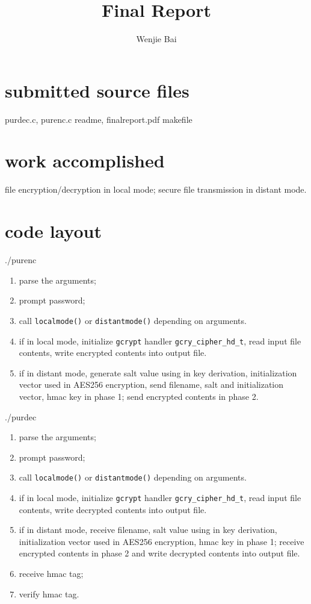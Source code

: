 \documentclass[11pt, oneside]{article}   	%
\title{Final Report}
\author{Wenjie Bai}
\date{}							%
\begin{document}
\maketitle

\section{submitted source files}
purdec.c, purenc.c readme, finalreport.pdf makefile

\section{work accomplished}
file encryption/decryption in local mode; secure file transmission in distant mode. 
\section{code layout}
./purenc

\begin{enumerate}
\item parse the arguments;
\item prompt password;
\item call \texttt{localmode()} or \texttt{distantmode()} depending on arguments.
\item if in local mode,  initialize \texttt{gcrypt} handler \verb|gcry_cipher_hd_t|, read input file contents, write encrypted contents into output file.
\item if in distant mode, generate salt value using in key derivation, initialization vector used in AES256 encryption, send filename, salt and initialization vector, hmac key in phase 1; send encrypted contents in phase 2.
\end{enumerate}

./purdec

\begin{enumerate}
\item parse the arguments;
\item prompt password;
\item call \texttt{localmode()} or \texttt{distantmode()} depending on arguments.
\item if in local mode,  initialize \texttt{gcrypt} handler \verb|gcry_cipher_hd_t|, read input file contents, write decrypted contents into output file.
\item if in distant mode, receive filename, salt value using in key derivation, initialization vector used in AES256 encryption, hmac key in phase 1; receive encrypted contents in phase 2 and write decrypted contents into output file.
\item receive hmac tag;
\item verify hmac tag.
\end{enumerate}
\end{document}
